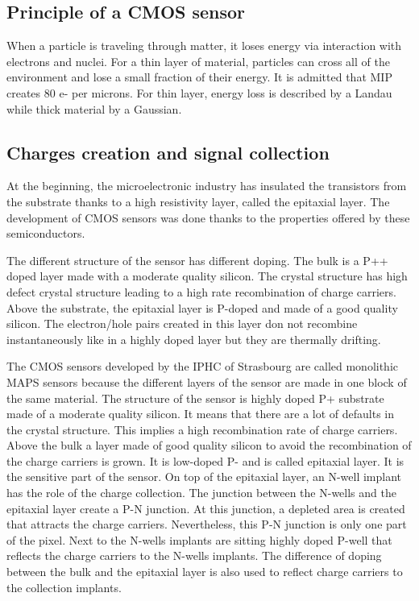     \subsection{Principle of a CMOS sensor}

    When a particle is traveling through matter, it loses energy via interaction with electrons and nuclei.
    For a thin layer of material, particles can cross all of the environment and lose a small fraction of their energy.
    It is admitted that \gls{MIP} creates 80 e- per microns. 
    For thin layer, energy loss is described by a Landau while thick material by a Gaussian.

    \subsection{Charges creation and signal collection}   

    At the beginning, the microelectronic industry has insulated the transistors from the substrate thanks to a high resistivity layer, called the epitaxial layer.
    The development of \gls{CMOS} sensors was done thanks to the properties offered by these semiconductors.

    The different structure of the sensor has different doping.
    The bulk is a P++ doped layer made with a moderate quality silicon.
    The crystal structure has high defect crystal structure leading to a high rate recombination of charge carriers.
    Above the substrate, the epitaxial layer is P-doped and made of a good quality silicon.
    The electron/hole pairs created in this layer don not recombine instantaneously like in a highly doped layer but they are thermally drifting. 
    
    The \gls{CMOS} sensors developed by the IPHC of Strasbourg are called monolithic \gls{MAPS} sensors because the different layers of the sensor are made in one block of the same material.
    The structure of the sensor is highly doped P+ substrate made of a moderate quality silicon. 
    It means that there are a lot of defaults in the crystal structure.
    This implies a high recombination rate of charge carriers.
    Above the bulk a layer made of good quality silicon to avoid the recombination of the charge carriers is grown.
    It is low-doped P- and is called epitaxial layer. 
    It is the sensitive part of the sensor. 
    On top of the epitaxial layer, an N-well implant has the role of the charge collection.
    The junction between the N-wells and the epitaxial layer create a P-N junction.
    At this junction, a depleted area is created that attracts the charge carriers.
    Nevertheless, this P-N junction is only one part of the pixel.
    Next to the N-wells implants are sitting highly doped P-well that reflects the charge carriers to the N-wells implants. 
    The difference of doping between the bulk and the epitaxial layer is also used to reflect charge carriers to the collection implants.

